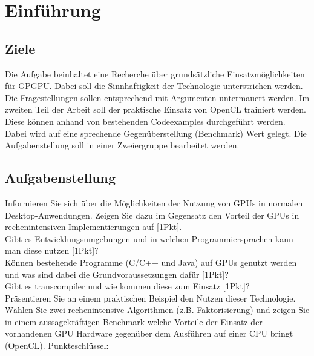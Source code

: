 \documentclass[letterpaper, 12pt]{article}
\let\tempsection\section
\renewcommand\section[1]{\vspace{-0.3cm}\tempsection{#1}\vspace{-0.3cm}}
\let\tempsubsection\subsection
\renewcommand\subsection[1]{\vspace{0cm}\tempsubsection{#1}\vspace{0cm}}
\begin{document}
\parindent 0pt
\parskip 6pt



\clearpage
\thispagestyle{empty}
\tableofcontents

\newpage
{}
\pagestyle{fancy}

\section{Einführung}
\subsection{Ziele}
Die Aufgabe beinhaltet eine Recherche über grundsätzliche Einsatzmöglichkeiten für GPGPU. Dabei soll die Sinnhaftigkeit der Technologie unterstrichen werden. Die Fragestellungen sollen entsprechend mit Argumenten untermauert werden.
Im zweiten Teil der Arbeit soll der praktische Einsatz von OpenCL trainiert werden. Diese können anhand von bestehenden Codeexamples durchgeführt werden. Dabei wird auf eine sprechende Gegenüberstellung (Benchmark) Wert gelegt.
Die Aufgabenstellung soll in einer Zweiergruppe bearbeitet werden.

\subsection{Aufgabenstellung}
Informieren Sie sich über die Möglichkeiten der Nutzung von GPUs in normalen Desktop-Anwendungen. Zeigen Sie dazu im Gegensatz den Vorteil der GPUs in rechenintensiven Implementierungen auf [1Pkt]. \\
Gibt es Entwicklungsumgebungen und in welchen Programmiersprachen kann man diese nutzen [1Pkt]? \\
Können bestehende Programme (C/C++ und Java) auf GPUs genutzt werden und was sind dabei die Grundvoraussetzungen dafür [1Pkt]? \\ Gibt es transcompiler und wie kommen diese zum Einsatz [1Pkt]? \\

Präsentieren Sie an einem praktischen Beispiel den Nutzen dieser Technologie. Wählen Sie zwei rechenintensive Algorithmen (z.B. Faktorisierung) und zeigen Sie in einem aussagekräftigen Benchmark welche Vorteile der Einsatz der vorhandenen GPU Hardware gegenüber dem Ausführen auf einer CPU bringt (OpenCL). Punkteschlüssel: \\
\end{document}
